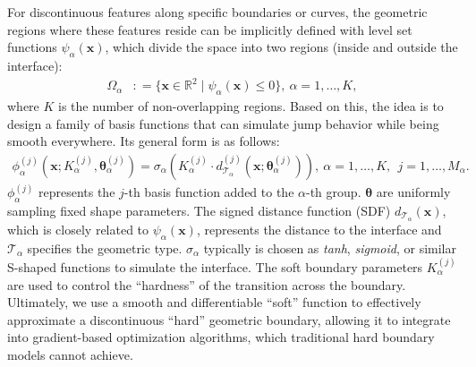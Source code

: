 \documentclass{article}
\theoremstyle{plain}
\theoremstyle{definition}
\begin{document}
For discontinuous features along specific boundaries or curves,  the geometric regions where these features reside can be implicitly defined with level set functions $\psi_\alpha(\boldsymbol{x})$, which divide the space into two regions (inside and outside the interface): 
\begin{align}
\label{area}
\Omega_\alpha &: = \{ \boldsymbol{x} \in \mathbb{R}^2 \mid \psi_\alpha(\boldsymbol{x}) \le 0 \}, \ \alpha=1, \ldots,  {K},
\end{align}
 {where 
$K$ is the number of non-overlapping regions}. Based on this,  the idea is to design a family of basis functions that can simulate jump behavior while being smooth everywhere. Its general form is as follows: 
\begin{align}
\label{jump}
    \phi_\alpha^{(j)}(\boldsymbol{x};K_\alpha^{(j)},\boldsymbol{\theta}_\alpha^{(j)}) = \sigma_{\alpha}\left(K_\alpha^{(j)} \cdot d_{\mathcal{T}_\alpha}^{(j)}(\boldsymbol{x};\boldsymbol{\theta}_\alpha^{(j)}) \right),  \ \alpha=1, \ldots,  {K},\  \ j=1, \ldots, M_\alpha. 
\end{align}
$\phi^{(j)}_\alpha$ represents the $j$-th basis function added to the $\alpha$-th group. $\boldsymbol{\theta}$ are uniformly sampling fixed shape parameters. The signed distance function (SDF) $d_{\mathcal{T}_\alpha}(\boldsymbol{x})$, which is closely related to $\psi_\alpha(\boldsymbol{x})$, represents the distance to the interface and $\mathcal{T}_\alpha$ specifies the geometric type.  $\sigma_\alpha$ typically is chosen as {\it tanh},  {\it sigmoid},  or similar S-shaped functions to simulate the interface. The soft boundary parameters $K_\alpha^{(j)}$ are used to control the ``hardness'' of the transition across the boundary. Ultimately,  we use a smooth and differentiable ``soft'' function to effectively approximate a discontinuous ``hard'' geometric boundary, allowing it to integrate into gradient-based optimization algorithms,  which traditional hard boundary models cannot achieve.  
\end{document}
